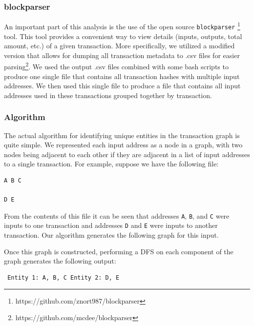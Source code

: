 \documentclass[11pt]{article}
\begin{document}
\subsubsection{blockparser} An important part of this analysis is the use of the open source \texttt{blockparser}
\footnote{https://github.com/znort987/blockparser} tool. This tool provides a convenient way to view details (inputs,
outputs, total amount, etc.) of a given transaction. More specifically, we utilized a modified version that allows for
dumping all transaction metadata to .csv files for easier parsing\footnote{https://github.com/mcdee/blockparser}. We
used the output .csv files combined with some bash scripts to produce one single file that contains all transaction
hashes with multiple input addresses. We then used this single file to produce a file that contains all input addresses
used in these transactions grouped together by transaction.

\subsubsection{Algorithm} The actual algorithm for identifying unique entities in the transaction graph is quite simple.
We represented each input address as a node in a graph, with two nodes being adjacent to each other if they are adjacent
in a list of input addresses to a single transaction. For example, suppose we have the following file: \begin{verbatim}
A B C
 
D E \end{verbatim}

From the contents of this file it can be seen that addresses \texttt{A}, \texttt{B}, and \texttt{C} were inputs to one
transaction and addresses \texttt{D} and \texttt{E} were inputs to another transaction. Our algorithm generates the
following graph for this input.

\begin{center}  \end{center}

Once this graph is constructed, performing a DFS on each component of the graph generates the following output:
\begin{verbatim} Entity 1: A, B, C Entity 2: D, E \end{verbatim}
\end{document}
